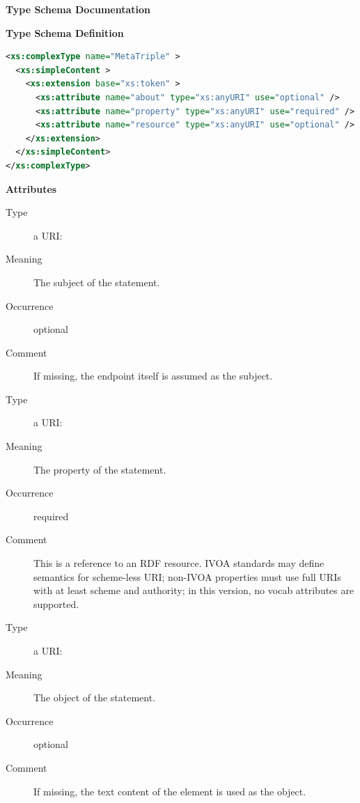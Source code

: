 \documentclass{ivoa}
\begin{document}
\begin{generated}
\begingroup
        \renewcommand*\descriptionlabel[1]{%
        \hbox to 5.5em{\emph{#1}\hfil}}\vspace{2ex}\noindent\textbf{ Type Schema Documentation}


\vspace{1ex}\noindent\textbf{ Type Schema Definition}

\begin{lstlisting}[language=XML,basicstyle=\footnotesize]
<xs:complexType name="MetaTriple" >
  <xs:simpleContent >
    <xs:extension base="xs:token" >
      <xs:attribute name="about" type="xs:anyURI" use="optional" />
      <xs:attribute name="property" type="xs:anyURI" use="required" />
      <xs:attribute name="resource" type="xs:anyURI" use="optional" />
    </xs:extension>
  </xs:simpleContent>
</xs:complexType>
\end{lstlisting}

\vspace{0.5ex}\noindent\textbf{ Attributes}

\begingroup\small\begin{bigdescription}
\item[about]
\begin{description}
\item[Type] a URI: 
\item[Meaning] The subject of the statement.
\item[Occurrence] optional
\item[Comment] If missing, the endpoint itself is assumed as the subject.
\end{description}
\item[property]
\begin{description}
\item[Type] a URI: 
\item[Meaning] The property of the statement.
\item[Occurrence] required
\item[Comment] This is a reference to an RDF resource.  IVOA standards may define
              semantics for scheme-less URI; non-IVOA properties must use
              full URIs with at least scheme and authority; in this
              version, no vocab attributes are supported.
\end{description}
\item[resource]
\begin{description}
\item[Type] a URI: 
\item[Meaning] The object of the statement.
\item[Occurrence] optional
\item[Comment] If missing, the text content of the element is used as the
              object.
\end{description}



\end{bigdescription}
\end{generated}
\end{document}
